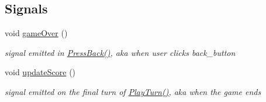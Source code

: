 \subsection*{Signals}
\begin{DoxyCompactItemize}
\item 
\mbox{\label{classGame2Grid_a33f724e897b96d77eebca3525ac4e095}} 
void \hyperlink{classGame2Grid_a33f724e897b96d77eebca3525ac4e095}{game\+Over} ()
\begin{DoxyCompactList}\small\item\em signal emitted in \hyperlink{classGame2Grid_afa62f8ea4795c6826402c53110c6ba49}{Press\+Back()}, aka when user clicks back\+\_\+button \end{DoxyCompactList}\item 
\mbox{\label{classGame2Grid_a57bb35871d7b4896f3ed9c6c48141e73}} 
void \hyperlink{classGame2Grid_a57bb35871d7b4896f3ed9c6c48141e73}{update\+Score} ()
\begin{DoxyCompactList}\small\item\em signal emitted on the final turn of \hyperlink{classGame2Grid_a0b6b7e172797f39841d9cff2964777fa}{Play\+Turn()}, aka when the game ends \end{DoxyCompactList}\end{DoxyCompactItemize}
